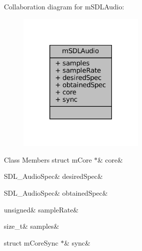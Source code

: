 Collaboration diagram for m\+S\+D\+L\+Audio\+:
\nopagebreak
\begin{figure}[H]
\begin{center}
\leavevmode
\includegraphics[width=174pt]{structm_s_d_l_audio__coll__graph}
\end{center}
\end{figure}
\begin{DoxyFields}{Class Members}
\mbox{\label{sdl-audio_8h_aa602915b07cc2e6432ccce420f99db63}} 
struct mCore $\ast$&
core&
\\
\hline

\mbox{\label{sdl-audio_8h_ae02d68378faeaec618150630f721a20c}} 
SDL\_AudioSpec&
desiredSpec&
\\
\hline

\mbox{\label{sdl-audio_8h_abf9c0708ac909302d82f91cbd756183a}} 
SDL\_AudioSpec&
obtainedSpec&
\\
\hline

\mbox{\label{sdl-audio_8h_a93263052a4223e2af8c38eda2d546acf}} 
unsigned&
sampleRate&
\\
\hline

\mbox{\label{sdl-audio_8h_aff4aa608198da84d3b1d808dafe1d999}} 
size\_t&
samples&
\\
\hline

\mbox{\label{sdl-audio_8h_a8c0e0b4b9d45f70067bccd9f029bd26b}} 
struct mCoreSync $\ast$&
sync&
\\
\hline

\end{DoxyFields}


